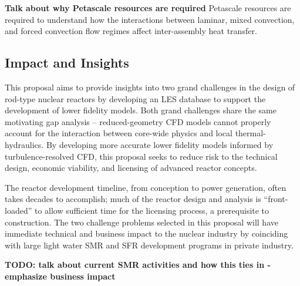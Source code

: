 \documentclass[11pt,letterpaper,english]{article}
\begin{document}
{\bf Talk about why Petascale resources are required}
Petascale resources are required to understand how the interactions between laminar, mixed convection, and forced convection flow regimes affect inter-assembly heat transfer.




\vspace{-.25in}
\subsection{Impact and Insights}
\vspace{-.2in}

This proposal aims to provide insights into two grand challenges in the design of rod-type nuclear reactors by developing an LES database to support the development of lower fidelity models. Both grand challenges share the same motivating gap analysis -- reduced-geometry CFD models cannot properly account for the interaction between core-wide physics and local thermal-hydraulics. By developing more accurate lower fidelity models informed by turbulence-resolved CFD, this proposal seeks to reduce risk to the technical design, economic viability, and licensing of advanced reactor concepts. 

The reactor development timeline, from conception to power generation, often takes decades to accomplish; much of the reactor design and analysis is ``front-loaded'' to allow sufficient time for the licensing process, a prerequisite to construction. The two challenge problems selected in this proposal will have immediate technical and business impact to the nuclear industry by coinciding with large light water SMR and SFR development programs in private industry.

{\bf TODO: talk about current SMR activities and how this ties in - emphasize business impact}
\end{document}
